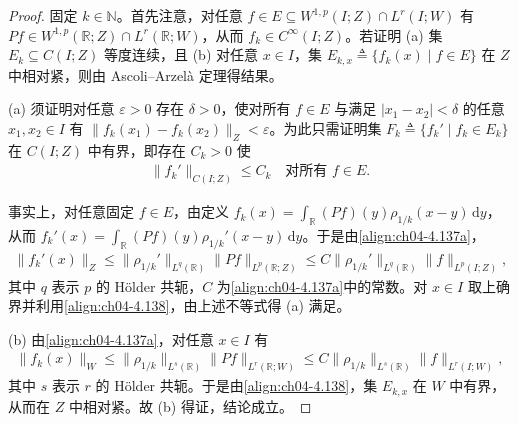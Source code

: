 \documentclass[../../main.tex]{subfiles}%
\begin{document}
\begin{proof}
固定 $k\in\mathbb{N}$。首先注意，对任意 $f\in E\subseteq W^{1,p}(I;Z)\cap L^r(I;W)$ 有 $Pf\in W^{1,p}(\mathbb{R};Z)\cap L^r(\mathbb{R};W)$，从而 $f_k\in C^\infty(I;Z)$。若证明 (a) 集 $E_k\subseteq C(I;Z)$ 等度连续，且 (b) 对任意 $x\in I$，集 $E_{k,x}\triangleq\{f_k(x)\mid f\in E\}$ 在 $Z$ 中相对紧，则由 Ascoli--Arzelà 定理得结果。

(a) 须证明对任意 $\varepsilon>0$ 存在 $\delta>0$，使对所有 $f\in E$ 与满足 $|x_1-x_2|<\delta$ 的任意 $x_1,x_2\in I$ 有 $\|f_k(x_1)-f_k(x_2)\|_Z<\varepsilon$。为此只需证明集 $F_k\triangleq\{f_k'\mid f_k\in E_k\}$ 在 $C(I;Z)$ 中有界，即存在 $C_k>0$ 使
\begin{align}
\|f_k'\|_{C(I;Z)}\leqslant C_k\quad\text{对所有 }f\in E. \label{align:ch04-4.140}
\end{align}

事实上，对任意固定 $f\in E$，由定义 $f_k(x)=\int_{\mathbb{R}}(Pf)(y)\rho_{1/k}(x-y)\,\mathrm{d}y$，从而 $f_k'(x)=\int_{\mathbb{R}}(Pf)(y)\rho_{1/k}'(x-y)\,\mathrm{d}y$。于是由\eqref{align:ch04-4.137a}，
\begin{align*}
\|f_k'(x)\|_Z\leqslant\|\rho_{1/k}'\|_{L^q(\mathbb{R})}\|Pf\|_{L^p(\mathbb{R};Z)}
\leqslant C\|\rho_{1/k}'\|_{L^q(\mathbb{R})}\|f\|_{L^p(I;Z)},
\end{align*}
其中 $q$ 表示 $p$ 的 Hölder 共轭，$C$ 为\eqref{align:ch04-4.137a}中的常数。对 $x\in I$ 取上确界并利用\eqref{align:ch04-4.138}，由上述不等式得 (a) 满足。

(b) 由\eqref{align:ch04-4.137a}，对任意 $x\in I$ 有
\begin{align*}
\|f_k(x)\|_W\leqslant\|\rho_{1/k}\|_{L^s(\mathbb{R})}\|Pf\|_{L^r(\mathbb{R};W)}
\leqslant C\|\rho_{1/k}\|_{L^s(\mathbb{R})}\|f\|_{L^r(I;W)},
\end{align*}
其中 $s$ 表示 $r$ 的 Hölder 共轭。于是由\eqref{align:ch04-4.138}，集 $E_{k,x}$ 在 $W$ 中有界，从而在 $Z$ 中相对紧。故 (b) 得证，结论成立。
\end{proof}
\end{document}
